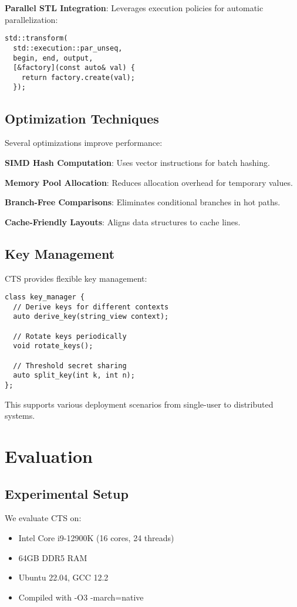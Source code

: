 \documentclass[10pt,conference]{IEEEtran}
\begin{document}
\textbf{Parallel STL Integration}: Leverages execution policies for automatic parallelization:
\begin{lstlisting}
std::transform(
  std::execution::par_unseq,
  begin, end, output,
  [&factory](const auto& val) {
    return factory.create(val);
  });
\end{lstlisting}

\subsection{Optimization Techniques}

Several optimizations improve performance:

\textbf{SIMD Hash Computation}: Uses vector instructions for batch hashing.

\textbf{Memory Pool Allocation}: Reduces allocation overhead for temporary values.

\textbf{Branch-Free Comparisons}: Eliminates conditional branches in hot paths.

\textbf{Cache-Friendly Layouts}: Aligns data structures to cache lines.

\subsection{Key Management}

CTS provides flexible key management:

\begin{lstlisting}
class key_manager {
  // Derive keys for different contexts
  auto derive_key(string_view context);

  // Rotate keys periodically
  void rotate_keys();

  // Threshold secret sharing
  auto split_key(int k, int n);
};
\end{lstlisting}

This supports various deployment scenarios from single-user to distributed systems.

\section{Evaluation}
\label{sec:evaluation}

\subsection{Experimental Setup}

We evaluate CTS on:
\begin{itemize}
\item Intel Core i9-12900K (16 cores, 24 threads)
\item 64GB DDR5 RAM
\item Ubuntu 22.04, GCC 12.2
\item Compiled with -O3 -march=native
\end{itemize}
\end{document}

